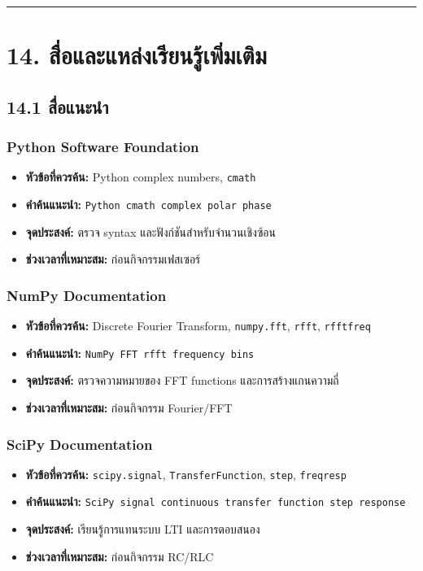 \par\noindent\rule{\textwidth}{0.4pt}\par

\section{14. สื่อและแหล่งเรียนรู้เพิ่มเติม}

\subsection{14.1 สื่อแนะนำ}

\subsubsection{Python Software Foundation}

\begin{itemize}
    \item \textbf{หัวข้อที่ควรค้น:} Python complex numbers, \texttt{cmath}
    \item \textbf{คำค้นแนะนำ:} \texttt{Python cmath complex polar phase}
    \item \textbf{จุดประสงค์:} ตรวจ syntax และฟังก์ชันสำหรับจำนวนเชิงซ้อน
    \item \textbf{ช่วงเวลาที่เหมาะสม:} ก่อนกิจกรรมเฟสเซอร์
\end{itemize}

\subsubsection{NumPy Documentation}

\begin{itemize}
    \item \textbf{หัวข้อที่ควรค้น:} Discrete Fourier Transform, \texttt{numpy.fft}, \texttt{rfft}, \texttt{rfftfreq}
    \item \textbf{คำค้นแนะนำ:} \texttt{NumPy FFT rfft frequency bins}
    \item \textbf{จุดประสงค์:} ตรวจความหมายของ FFT functions และการสร้างแกนความถี่
    \item \textbf{ช่วงเวลาที่เหมาะสม:} ก่อนกิจกรรม Fourier/FFT
\end{itemize}

\subsubsection{SciPy Documentation}

\begin{itemize}
    \item \textbf{หัวข้อที่ควรค้น:} \texttt{scipy.signal}, \texttt{TransferFunction}, \texttt{step}, \texttt{freqresp}
    \item \textbf{คำค้นแนะนำ:} \texttt{SciPy signal continuous transfer function step response}
    \item \textbf{จุดประสงค์:} เรียนรู้การแทนระบบ LTI และการตอบสนอง
    \item \textbf{ช่วงเวลาที่เหมาะสม:} ก่อนกิจกรรม RC/RLC
\end{itemize}

